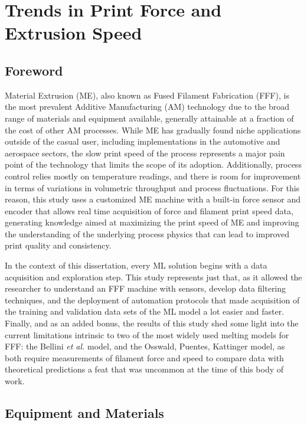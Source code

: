 \documentclass[main.tex]{subfiles}
\begin{document}
\chapter{Trends in Print Force and Extrusion Speed} \label{ch:data_ex}
\section{Foreword} \label{sec:fw_dataex}

Material Extrusion (ME), also known as Fused Filament Fabrication (FFF), is the most prevalent Additive Manufacturing (AM) technology due to the broad range of materials and equipment available, generally attainable at a fraction of the cost of other AM processes. While ME has gradually found niche applications outside of the casual user, including implementations in the automotive and aerospace sectors, the slow print speed of the process represents a major pain point of the technology that limits the scope of its adoption. Additionally, process control relies mostly on temperature readings, and there is room for improvement in terms of variations in volumetric throughput and process fluctuations. For this reason, this study uses a customized ME machine with a built-in force sensor and encoder that allows real time acquisition of force and filament print speed data, generating knowledge aimed at maximizing the print speed of ME and improving the understanding of the underlying process physics that can lead to improved print quality and consistency. 

In the context of this dissertation, every ML solution begins with a data acquisition and exploration step. This study represents just that, as it allowed the researcher to understand an FFF machine with sensors, develop data filtering techniques, and the deployment of automation protocols that made acquisition of the training and validation data sets of the ML model a lot easier and faster. Finally, and as an added bonus, the results of this study shed some light into the current limitations intrinsic to two of the most widely used melting models for FFF: the Bellini \emph{et al.} model, and the Osswald, Puentes, Kattinger model, as both require measurements of filament force and speed to compare data with theoretical predictions \textemdash a feat that was uncommon at the time of this body of work.

\section{Equipment and Materials} \label{ssec:mat_data}
\end{document}
